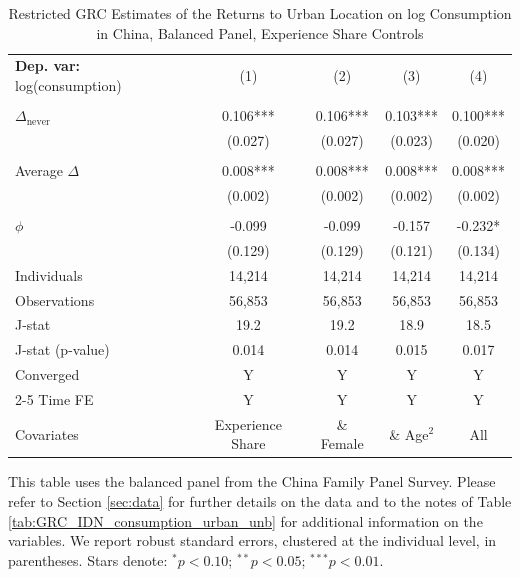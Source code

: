 \begin{table}[htbp] \centering \begin{threeparttable}
 \caption{Restricted GRC Estimates of the Returns to Urban Location on log Consumption in China, Balanced Panel, Experience Share Controls} 
 \label{tab:GRC_CHN_consumption_urban_bal_exp_sh} 
\begin{tabular}{l cccc} \toprule  \textbf{Dep. var:}  log(consumption) 
                    &\multicolumn{1}{c}{(1)}   &\multicolumn{1}{c}{(2)}   &\multicolumn{1}{c}{(3)}   &\multicolumn{1}{c}{(4)}   \\
                    &               &               &               &               \\
\addlinespace
$\Delta_{\text{never}}$&       0.106***&       0.106***&       0.103***&       0.100***\\
                    &     (0.027)   &     (0.027)   &     (0.023)   &     (0.020)   \\
                    &               &               &               &               \\
\addlinespace
Average $\Delta$    &       0.008***&       0.008***&       0.008***&       0.008***\\
                    &     (0.002)   &     (0.002)   &     (0.002)   &     (0.002)   \\
                    &               &               &               &               \\
\addlinespace
$\phi$              &      -0.099   &      -0.099   &      -0.157   &      -0.232*  \\
                    &     (0.129)   &     (0.129)   &     (0.121)   &     (0.134)   \\
\addlinespace
Individuals         &      14,214   &      14,214   &      14,214   &      14,214   \\
Observations        &      56,853   &      56,853   &      56,853   &      56,853   \\
J-stat              &        19.2   &        19.2   &        18.9   &        18.5   \\
J-stat (p-value)    &       0.014   &       0.014   &       0.015   &       0.017   \\
Converged           &           Y   &           Y   &           Y   &           Y   \\
\cmidrule{2-5} Time FE & Y & Y & Y & Y \\ Covariates & Experience Share & \& Female & \& Age$^2$ & All \\ \bottomrule \end{tabular} \begin{tablenotes}[flushleft] \footnotesize \item{This table uses the balanced panel from the China Family Panel Survey. Please refer to Section \ref{sec:data} for further details on the data and to the notes of Table \ref{tab:GRC_IDN_consumption_urban_unb} for additional information on the variables. We report robust standard errors, clustered at the individual level, in parentheses. Stars denote: $^{*} p<0.10$; $^{**} p<0.05$; $^{***} p<0.01$.} \end{tablenotes} \end{threeparttable} \end{table}
